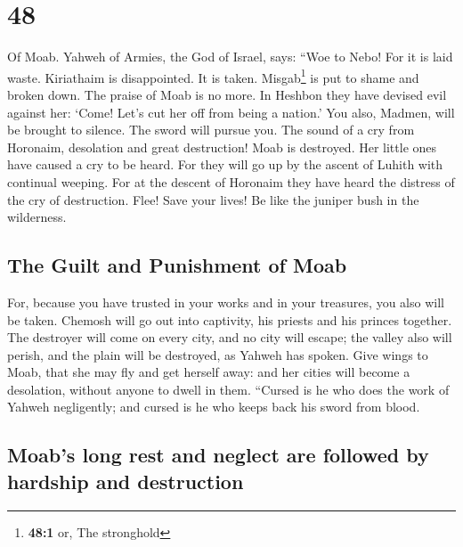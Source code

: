 \hypertarget{section-47}{%
\section{48}\label{section-47}}

 Of Moab. Yahweh of Armies, the God of Israel, says: ``Woe
to Nebo! For it is laid waste. Kiriathaim is disappointed. It is taken.
Misgab\footnote{\textbf{48:1} or, The stronghold} is put to shame and
broken down.  The praise of Moab is no more. In Heshbon
they have devised evil against her: `Come! Let's cut her off from being
a nation.' You also, Madmen, will be brought to silence. The sword will
pursue you.  The sound of a cry from Horonaim, desolation
and great destruction!  Moab is destroyed. Her little ones
have caused a cry to be heard.  For they will go up by the
ascent of Luhith with continual weeping. For at the descent of Horonaim
they have heard the distress of the cry of destruction. 
Flee! Save your lives! Be like the juniper bush in the wilderness.

\hypertarget{the-guilt-and-punishment-of-moab}{%
\subsection{The Guilt and Punishment of
Moab}\label{the-guilt-and-punishment-of-moab}}

 For, because you have trusted in your works and in your
treasures, you also will be taken. Chemosh will go out into captivity,
his priests and his princes together.  The destroyer will
come on every city, and no city will escape; the valley also will
perish, and the plain will be destroyed, as Yahweh has spoken.
 Give wings to Moab, that she may fly and get herself
away: and her cities will become a desolation, without anyone to dwell
in them.  ``Cursed is he who does the work of Yahweh
negligently; and cursed is he who keeps back his sword from blood.

\hypertarget{moabs-long-rest-and-neglect-are-followed-by-hardship-and-destruction}{%
\subsection{Moab's long rest and neglect are followed by hardship and
destruction}\label{moabs-long-rest-and-neglect-are-followed-by-hardship-and-destruction}}

